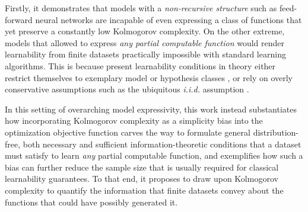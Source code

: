 Firstly, it demonstrates that models with a \textit{non-recursive structure} such as feed-forward neural networks are incapable of even expressing a class of functions that yet preserve a constantly low Kolmogorov complexity.
On the other extreme, models that allowed to express \textit{any partial computable function} would render learnability from finite datasets practically impossible with standard learning algorithms.
This is because present learnability conditions in theory either restrict themselves to exemplary model or hypothesis classes \cite{ahuja2021invariance,arjovsky2019invariant}, or rely on overly conservative assumptions such as the ubiquitous \textit{i.i.d.} assumption \cite{paccagnan2024pick,campi2023compression}.

In this setting of overarching model expressivity, this work instead substantiates how incorporating Kolmogorov complexity as a simplicity bias into the optimization objective function carves the way to formulate general distribution-free, both necessary and sufficient information-theoretic conditions that a dataset must satisfy to learn \textit{any} partial computable function, and exemplifies how such a bias can further reduce the sample size that is usually required for classical learnability guarantees.
To that end, it proposes to draw upon Kolmogorov complexity to quantify the information that finite datasets convey about the functions that could have possibly generated it.

